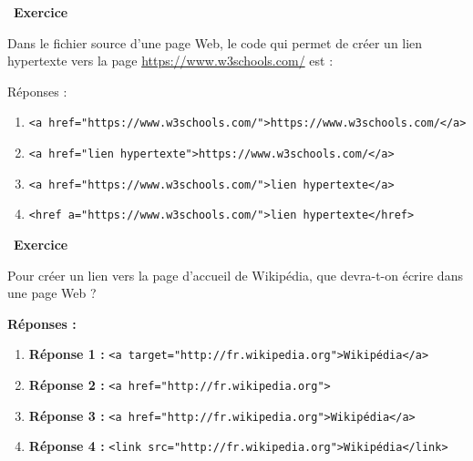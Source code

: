 \documentclass[
  11pt,
]{article}
\newcommand{\passthrough}[1]{#1}
\newcounter{exo}
\newenvironment{exercice}[1]
{\par \medskip   \addtocounter{exo}{1} \noindent  
\begin{bclogo}[arrondi =0.1,   noborder = true, logo=\bccrayon, marge=4]{~\textbf{Exercice} \textbf{\theexo} {\itshape #1} }  \par}
{
\end{bclogo}
 \par \bigskip }
\newcounter{def}
\begin{document}
\begin{exercice}{}

Dans le fichier source d'une page Web, le code qui permet de créer un
lien hypertexte vers la page \url{https://www.w3schools.com/} est :

Réponses :

\begin{enumerate}
\def\labelenumi{\arabic{enumi}.}
\item
  \passthrough{\lstinline!<a href="https://www.w3schools.com/">https://www.w3schools.com/</a>!}
\item
  \passthrough{\lstinline!<a href="lien hypertexte">https://www.w3schools.com/</a>!}
\item
  \passthrough{\lstinline!<a href="https://www.w3schools.com/">lien hypertexte</a>!}
\item
  \passthrough{\lstinline!<href a="https://www.w3schools.com/">lien hypertexte</href>!}
\end{enumerate}

\end{exercice}

\begin{exercice}{}

Pour créer un lien vers la page d'accueil de Wikipédia, que devra-t-on
écrire dans une page Web ?

\textbf{Réponses :}

\begin{enumerate}
\def\labelenumi{\arabic{enumi}.}
\item
  \textbf{Réponse 1 :}
  \passthrough{\lstinline!<a target="http://fr.wikipedia.org">Wikipédia</a>!}
\item
  \textbf{Réponse 2 :}
  \passthrough{\lstinline!<a href="http://fr.wikipedia.org">!}
\item
  \textbf{Réponse 3 :}
  \passthrough{\lstinline!<a href="http://fr.wikipedia.org">Wikipédia</a>!}
\item
  \textbf{Réponse 4 :}
  \passthrough{\lstinline!<link src="http://fr.wikipedia.org">Wikipédia</link>!}
\end{enumerate}

\end{exercice}
\end{document}
